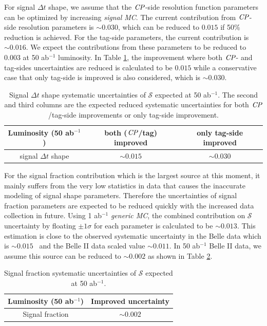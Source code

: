 For signal $\Delta t$ shape, we assume that the $\it{CP}$-side resolution function parameters can be optimized by increasing \textit{signal MC}. The current contribution from $\it{CP}$-side resolution parameters is $\sim 0.030$, which can be reduced to $0.015$ if 50\% reduction is achieved.
For the tag-side parameters, the current contribution is $\sim 0.016$. We expect the contributions from these parameters to be reduced to $0.003$ at 50 ab$^{-1}$ luminosity. In Table  \ref{tab:sig_shape}, the improvement where both $\it{CP}$- and tag-sides uncertainties are reduced is calculated to be $0.015$ while a conservative case that only tag-side is improved is also considered, which is $\sim0.030$.
\begin{table}[H]
		\centering
		\caption{ Signal $\Delta t$ shape systematic uncertainties of $\mathcal{S}$ expected at 50 ab$^{-1}$. The second and third columns are the expected reduced systematic uncertainties for both $\it{CP}$/tag-side improvements or only tag-side improvement.}
		\label{tab:sig_shape}
		\begin{tabular}{c| c| c }
			\hline
			Luminosity (50 ab$^{-1}$) & both ($\it{CP}$/tag) improved & only tag-side improved \\
			\hline
			signal $\Delta t$ shape &  $\sim0.015$ & $\sim0.030$\\
			\hline
		\end{tabular}
\end{table}
For the signal fraction contribution which is the largest source at this moment, it mainly suffers from the very low statistics in data that causes the inaccurate modeling of signal shape parameters. Therefore the uncertainties of signal fraction parameters are expected to be reduced quickly with the increased data collection in future. Using 1 ab$^{-1}$ \textit{generic MC}, the combined contribution on $\mathcal{S}$ uncertainty by floating $\pm 1 \sigma$ for each parameter is calculated to be $\sim 0.013$. This estimation is close to the observed systematic uncertainty in the Belle data which is  $\sim0.015$~\cite{kang2020measurement} and the Belle II data scaled value $\sim 0.011$. In 50 ab$^{-1}$ Belle II data, we assume this source can be reduced to $\sim 0.002$ as shown in Table \ref{tab:sig_f}.

\begin{table}[htpb]
	\centering
	\caption{ Signal fraction systematic uncertainties of $\mathcal{S}$ expected at 50 ab$^{-1}$.}
	\label{tab:sig_f}
	\begin{tabular}{c| c}
		\hline
		Luminosity (50 ab$^{-1}$) & Improved uncertainty \\
		\hline
		Signal fraction &  $\sim0.002$ \\
		\hline
	\end{tabular}
\end{table}

